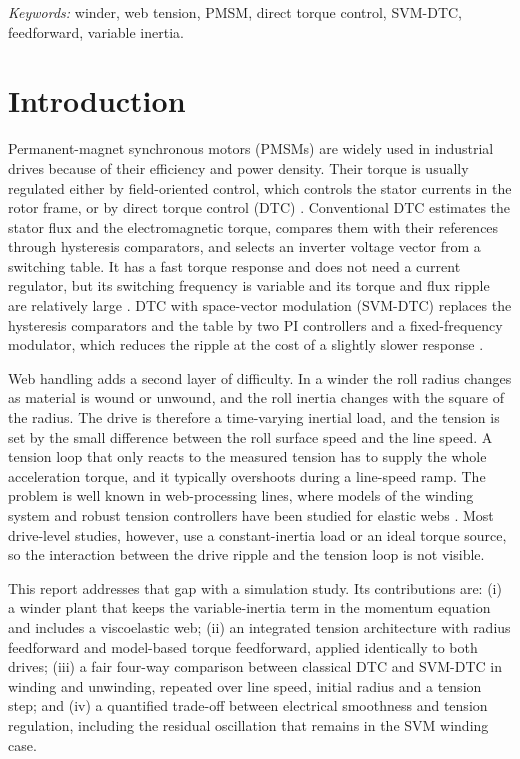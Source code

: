 \documentclass[12pt,a4paper,onecolumn]{IEEEtran}
\newif\iftoc \tocfalse         %
\begin{document}
\vspace{0.2cm}
\noindent\textit{Keywords:} winder, web tension, PMSM, direct torque control, SVM-DTC, feedforward, variable inertia.

\iftoc\clearpage\tableofcontents\clearpage\fi

\section{Introduction}
Permanent-magnet synchronous motors (PMSMs) are widely used in industrial drives because of their efficiency and power density. Their torque is usually regulated either by field-oriented control, which controls the stator currents in the rotor frame, or by direct torque control (DTC) \cite{takahashi1986,depenbrock1988}. Conventional DTC estimates the stator flux and the electromagnetic torque, compares them with their references through hysteresis comparators, and selects an inverter voltage vector from a switching table. It has a fast torque response and does not need a current regulator, but its switching frequency is variable and its torque and flux ripple are relatively large \cite{buja2004}. DTC with space-vector modulation (SVM-DTC) replaces the hysteresis comparators and the table by two PI controllers and a fixed-frequency modulator, which reduces the ripple at the cost of a slightly slower response \cite{habetler1992,tang2004}.

Web handling adds a second layer of difficulty. In a winder the roll radius changes as material is wound or unwound, and the roll inertia changes with the square of the radius. The drive is therefore a time-varying inertial load, and the tension is set by the small difference between the roll surface speed and the line speed. A tension loop that only reacts to the measured tension has to supply the whole acceleration torque, and it typically overshoots during a line-speed ramp. The problem is well known in web-processing lines, where models of the winding system and robust tension controllers have been studied for elastic webs \cite{koc2002,pagilla2007}. Most drive-level studies, however, use a constant-inertia load or an ideal torque source, so the interaction between the drive ripple and the tension loop is not visible.

This report addresses that gap with a simulation study. Its contributions are: (i) a winder plant that keeps the variable-inertia term in the momentum equation and includes a viscoelastic web; (ii) an integrated tension architecture with radius feedforward and model-based torque feedforward, applied identically to both drives; (iii) a fair four-way comparison between classical DTC and SVM-DTC in winding and unwinding, repeated over line speed, initial radius and a tension step; and (iv) a quantified trade-off between electrical smoothness and tension regulation, including the residual oscillation that remains in the SVM winding case.
\end{document}
